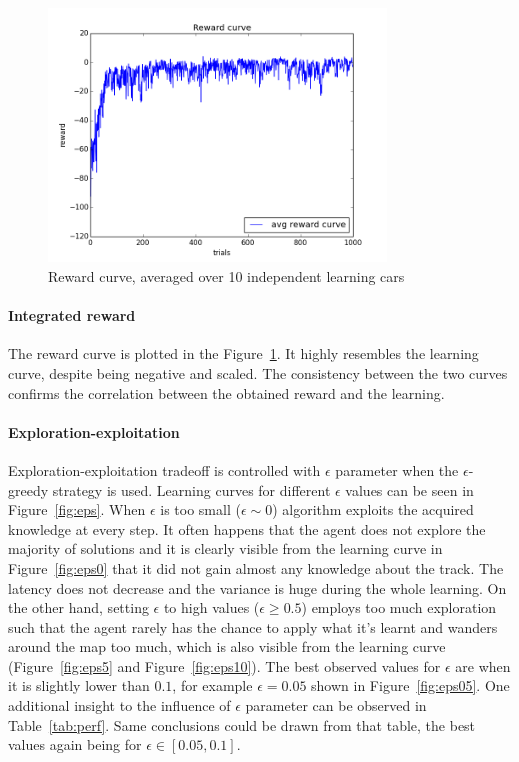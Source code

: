 \begin{figure}[h!]
\centering
\includegraphics[width=0.8\textwidth]{figures/reward_curve.png}
\caption{\label{fig:rcurve}Reward curve, averaged over 10 independent learning
cars}
\end{figure}
 
\paragraph{Integrated reward}
The reward curve is plotted in the Figure~\ref{fig:rcurve}. It highly resembles
the learning curve, despite being negative and scaled. The consistency between
the two curves confirms the correlation between the obtained reward and the
learning.

\paragraph{Exploration-exploitation}
Exploration-exploitation tradeoff is controlled with $\epsilon$ parameter when
the $\epsilon$-greedy strategy is used. Learning curves for different $\epsilon$
values can be seen in Figure~\ref{fig:eps}. When $\epsilon$ is too small
($\epsilon \sim 0$) algorithm exploits the acquired knowledge at every step. It
often happens that the agent does not explore the majority of solutions and it
is clearly visible from the learning curve in Figure~\ref{fig:eps0} that it did
not gain almost any knowledge about the track. The latency does not decrease and
the variance is huge during the whole learning. On the other hand, setting
$\epsilon$ to high values ($\epsilon \ge 0.5$) employs too much exploration such
that the agent rarely has the chance to apply what it's learnt and wanders
around the map too much, which is also visible from the learning curve
(Figure~\ref{fig:eps5} and Figure~\ref{fig:eps10}). The best observed values for
$\epsilon$ are when it is slightly lower than $0.1$, for example $\epsilon =
0.05$ shown in Figure~\ref{fig:eps05}.  One additional insight to the influence
of $\epsilon$ parameter can be observed in Table~\ref{tab:perf}. Same
conclusions could be drawn from that table, the best values again being for
$\epsilon \in [0.05, 0.1]$.

